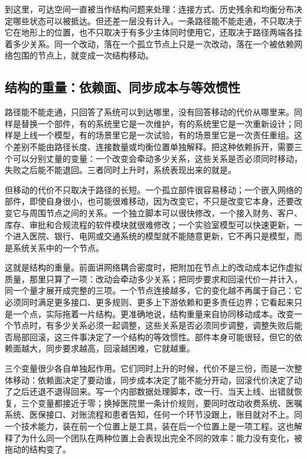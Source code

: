 到这里，可达空间一直被当作结构问题来处理：连接方式、历史残余和均衡分布决定哪些状态可以被抵达。但还差一层没有计入。一条路径能不能走通，不只取决于它在地形上的位置，也不只取决于有多少主体同时使用它，还取决于路径两端各挂着多少关系。同一个改动，落在一个孤立节点上只是一次改动，落在一个被依赖网络包围的节点上，就变成一次结构移动。

\subsection{结构的重量：依赖面、同步成本与等效惯性}

路径能不能走通，只回答了系统可以到达哪里，没有回答移动的代价从哪里来。同样是替换一个部件，有的系统里它是一次维护，有的系统里它是一次重新设计；同样是上线一个模型，有的场景里它是一次试验，有的场景里它是一次责任重组。这个差别不能由路径长度、连接数量或均衡位置单独解释。把这种依赖拆开，需要三个可以分别丈量的变量：一个改变会牵动多少关系，这些关系是否必须同时移动，失败之后能不能退回。三者同时上升时，系统表现出来的就是。


但移动的代价不只取决于路径的长短。一个孤立部件很容易移动；一个嵌入网络的部件，即使自身很小，也可能很难移动，因为改变它，不只是改变它本身，还要改变它与周围节点之间的关系。一个独立脚本可以很快修改，一个接入财务、客户、库存、审批和合规流程的软件模块就很难修改；一个实验室模型可以快速更新，一个进入医院、银行、电网或交通系统的模型就不能随意更新，它不再只是模型，而是系统关系中的一个节点。

这就是结构的重量。前面讲网络耦合密度时，把附加在节点上的改动成本记作虚拟质量，那里只算了一项：改动会牵动多少关系；把同步要求和回滚代价一并计入，同一个量才展开成完整的三项。一个节点连接越多，它的变化越不再属于自己：它必须同时满足更多接口、更多规则、更多上下游依赖和更多责任边界；它看起来只是一个点，实际拖着一片结构。更准确地说，结构重量来自协同移动成本。改变一个节点时，有多少关系必须一起调整，这些关系是否必须同步调整，调整失败后能否局部回滚，这三件事决定了一个结构的等效惯性。部件本身可能很轻，但它的依赖面越大，同步要求越高，回滚越困难，它就越重。

三个变量很少各自单独起作用。它们同时上升的时候，代价不是三份，而是一次整体移动：依赖面决定了要动谁，同步成本决定了能不能分开动，回滚代价决定了动了之后还退不退得回来。写一个内部数据处理脚本，改一行、当天上线、出错就恢复，三个变量都接近于零；换掉医院里一条计价规则，要同时改动收费系统、医嘱系统、医保接口、对账流程和患者告知，任何一个环节没跟上，账目就对不上。同一个技术能力，装在前一个位置上是工具，装在后一个位置上是一项工程。这也解释了为什么同一个团队在两种位置上会表现出完全不同的效率：能力没有变化，被拖动的结构变了。

